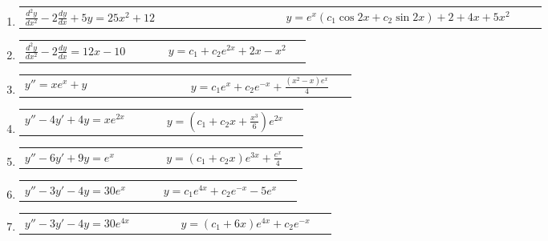 \documentclass[a4paper,12pt]{article}
\begin{document}
\begin{enumerate}
    \item
    \begin{tabularx}{\linewidth}{L{0.45\linewidth} R{0.45\linewidth}}
    \( \frac{d^2 y}{dx^2} - 2 \frac{dy}{dx} + 5 y = 25 x^2 + 12 \) & \(\displaystyle y = e^x \left(c_1 \cos 2x + c_2 \sin 2x \right) + 2 + 4x + 5x^2 \)
    \end{tabularx}
    
    \item
    \begin{tabularx}{\linewidth}{L{0.45\linewidth} R{0.45\linewidth}}
    \( \frac{d^2 y}{dx^2} - 2 \frac{dy}{dx} = 12 x - 10 \) & \(\displaystyle y = c_1 + c_2 e^{2x} + 2x - x^2 \)
    \end{tabularx}

    \item
    \begin{tabularx}{\linewidth}{L{0.45\linewidth} R{0.45\linewidth}}
    \( y'' = x e^x + y \) & \(\displaystyle y = c_1 e^x + c_2 e^{-x} + \frac{(x^2 - x) e^x}{4} \)
    \end{tabularx}

    \item
    \begin{tabularx}{\linewidth}{L{0.45\linewidth} R{0.45\linewidth}}
    \( y'' - 4 y' + 4 y = x e^{2x} \) & \(\displaystyle y = (c_1 + c_2 x + \frac{x^3}{6}) e^{2x} \)
    \end{tabularx}

    \item
    \begin{tabularx}{\linewidth}{L{0.45\linewidth} R{0.45\linewidth}}
    \( y'' - 6 y' + 9 y = e^x \) & \(\displaystyle y = (c_1 + c_2 x) e^{3x} + \frac{e^x}{4} \)
    \end{tabularx}

    \item
    \begin{tabularx}{\linewidth}{L{0.45\linewidth} R{0.45\linewidth}}
    \( y'' - 3 y' - 4 y = 30 e^x \) & \(\displaystyle y = c_1 e^{4x} + c_2 e^{-x} - 5 e^x \)
    \end{tabularx}

    \item
    \begin{tabularx}{\linewidth}{L{0.45\linewidth} R{0.45\linewidth}}
    \( y'' - 3 y' - 4 y = 30 e^{4x} \) & \(\displaystyle y = (c_1 + 6 x) e^{4x} + c_2 e^{-x} \)
    \end{tabularx}


\end{enumerate}
\end{document}

